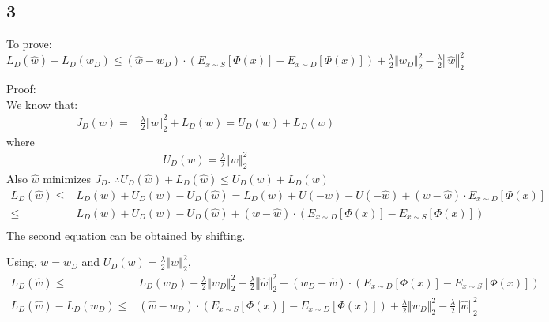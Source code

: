 \documentclass{article}
\begin{document}
\subsection*{3}
\begin{description}
  \item{To prove:} $ L_{D}(\hat{w})-L_{D}(w_{D})\leq\left(\hat{w}-w_{D}\right)\cdot\left(E_{x\sim S}\left[\Phi\left(x\right)\right]-E_{x\sim D}\left[\Phi\left(x\right)\right]\right)+\frac{\lambda}{2}\left\Vert w_{D}\right\Vert _{2}^{2}-\frac{\lambda}{2}\left\Vert \hat{w}\right\Vert _{2}^{2}$
  \item{Proof:} \\
    We know that:
    \begin{align*}
      J_{D}(w)= & \frac{\lambda}{2}\left\Vert w\right\Vert _{2}^{2}+L_{D}(w)=U_{D}\left(w\right)+L_{D}(w)
    \end{align*}
    where
    \begin{align*}
      U_{D}(w)=\frac{\lambda}{2}\left\Vert w\right\Vert _{2}^{2}
    \end{align*}
    Also $ \hat{w}$ minimizes $ J_{D} $.  $ \therefore U_{D}\left(\hat{w}\right)+L_{D}(\hat{w})\leq U_{D}\left(w\right)+L_{D}(w)$
    \begin{align*}
      L_{D}(\hat{w})\leq & L_{D}(w)+U_{D}\left(w\right)-U_{D}\left(\hat{w}\right)=L_{D}(w)+U\left(-w\right)-U\left(-\hat{w}\right)+\left(w-\hat{w}\right)\cdot E_{x\sim D}\left[\Phi(x)\right] \\
      \leq & L_{D}(w)+U_{D}\left(w\right)-U_{D}\left(\hat{w}\right)+\left(w-\hat{w}\right)\cdot\left(E_{x\sim D}\left[\Phi(x)\right]-E_{x\sim S}\left[\Phi(x)\right]\right) \\
    \end{align*}
    The second equation can be obtained by shifting.

    Using, $w=w_{D}$ and $U_{D}(w)=\frac{\lambda}{2}\left\Vert w\right\Vert _{2}^{2}$,
    \begin{align*}
      L_{D}(\hat{w}) \leq & L_{D}(w_{D})+\frac{\lambda}{2}\left\Vert w_{D}\right\Vert _{2}^{2}-\frac{\lambda}{2}\left\Vert \hat{w}\right\Vert _{2}^{2}+\left(w_{D}-\hat{w}\right)\cdot\left(E_{x\sim D}\left[\Phi(x)\right]-E_{x\sim S}\left[\Phi(x)\right]\right) \\
      L_{D}(\hat{w})-L_{D}(w_{D}) \leq & \left(\hat{w}-w_{D}\right)\cdot\left(E_{x\sim S}\left[\Phi(x)\right]-E_{x\sim D}\left[\Phi(x)\right]\right)+\frac{\lambda}{2}\left\Vert w_{D}\right\Vert _{2}^{2}-\frac{\lambda}{2}\left\Vert \hat{w}\right\Vert _{2}^{2} \\
    \end{align*}
\end{description}
\end{document}
